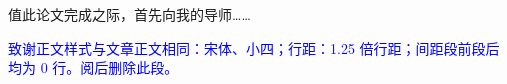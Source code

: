 %
%
%
%
%

\begin{acknowledgements}
    值此论文完成之际，首先向我的导师……
  
    \textcolor{blue}{致谢正文样式与文章正文相同：宋体、小四；行距：1.25 倍行距；间距段前段后均为 0 行。阅后删除此段。}
\end{acknowledgements}
  
